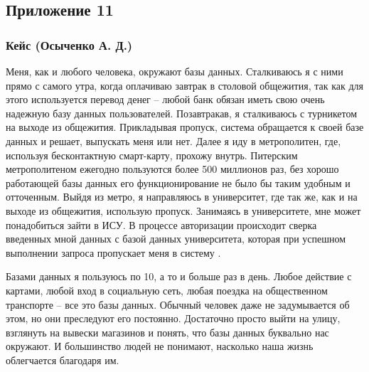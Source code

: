 \documentclass[a4paper,14pt]{extarticle}
\begin{document}
\newpage

\subsection*{\hfill Приложение 11}

\subsubsection*{\centering Кейс (Осыченко А. Д.)}

Меня, как и любого человека, окружают базы данных. Сталкиваюсь я с ними прямо с самого утра, когда оплачиваю завтрак в столовой общежития, так как для этого используется перевод денег – любой банк обязан иметь свою очень надежную базу данных пользователей. Позавтракав, я сталкиваюсь с турникетом на выходе из общежития. Прикладывая пропуск, система обращается к своей базе данных и решает, выпускать меня или нет. Далее я иду в метрополитен, где, используя бесконтактную смарт-карту, прохожу внутрь. Питерским метрополитеном ежегодно пользуются более 500 миллионов раз, без хорошо работающей базы данных его функционирование не было бы таким удобным и отточенным. Выйдя из метро, я направляюсь в университет, где так же, как и на выходе из общежития, использую пропуск. Занимаясь в университете, мне может понадобиться зайти в ИСУ. В процессе авторизации происходит сверка введенных мной данных с базой данных университета, которая при успешном выполнении запроса пропускает меня в систему .

Базами данных я пользуюсь по 10, а то и больше раз в день. Любое действие с картами, любой вход в социальную сеть, любая поездка на общественном транспорте – все это базы данных. Обычный человек даже не задумывается об этом, но они преследуют его постоянно. Достаточно просто выйти на улицу, взглянуть на вывески магазинов и понять, что базы данных буквально нас окружают. И большинство людей не понимают, насколько наша жизнь облегчается благодаря им.
\end{document}
